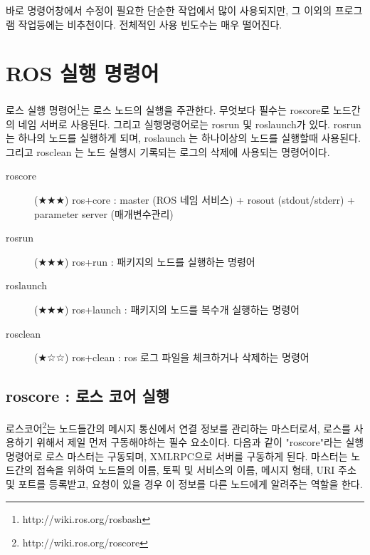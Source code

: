 \vspace{\baselineskip}
\noindent
바로 명령어창에서 수정이 필요한 단순한 작업에서 많이 사용되지만, 그 이외의 프로그램 작업등에는 비추천이다. 전체적인 사용 빈도수는 매우 떨어진다.

\section{ROS 실행 명령어}

로스 실행 명령어\footnote{http://wiki.ros.org/rosbash}는 로스 노드의 실행을 주관한다. 무엇보다 필수는 roscore로 노드간의 네임 서버로 사용된다. 그리고 실행명령어로는 rosrun 및 roslaunch가 있다. rosrun 는 하나의 노드를 실행하게 되며, roslaunch 는 하나이상의 노드를 실행할때 사용된다. 그리고 rosclean 는 노드 실행시 기록되는 로그의 삭제에 사용되는 명령어이다.

\vspace{\baselineskip}
\noindent
\begin{description}
\item[roscore] (★★★) ros+core : master (ROS 네임 서비스) + rosout (stdout/stderr) + parameter server (매개변수관리)
\item[rosrun] (★★★) ros+run : 패키지의 노드를 실행하는 명령어
\item[roslaunch] (★★★) ros+launch : 패키지의 노드를 복수개 실행하는 명령어
\item[rosclean] (★☆☆) ros+clean : ros 로그 파일을 체크하거나 삭제하는 명령어
\end{description}

\subsection{roscore : 로스 코어 실행}

로스코어\footnote{http://wiki.ros.org/roscore}는 노드들간의 메시지 통신에서 연결 정보를 관리하는 마스터로서, 로스를 사용하기 위해서 제일 먼저 구동해야하는 필수 요소이다. 다음과 같이 "roscore"라는 실행 명령어로 로스 마스터는 구동되며, XMLRPC으로 서버를 구동하게 된다. 마스터는 노드간의 접속을 위하여 노드들의 이름, 토픽 및 서비스의 이름, 메시지 형태, URI 주소 및 포트를  등록받고, 요청이 있을 경우 이 정보를 다른 노드에게 알려주는 역할을 한다. 

\setcounter{num}{0}

